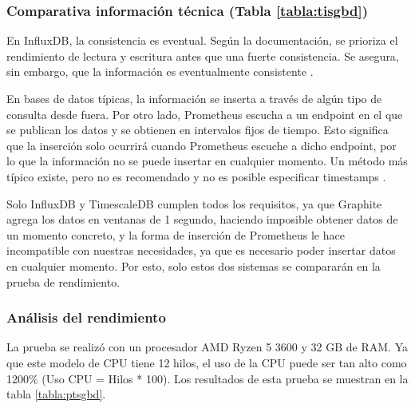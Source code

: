 \subsubsection*{Comparativa información técnica (Tabla \ref*{tabla:tisgbd})} En InfluxDB, la consistencia es eventual. Según
la documentación, se prioriza el rendimiento de lectura y escritura antes que una fuerte consistencia. Se asegura, sin 
embargo, que la información es eventualmente consistente \cite{influx:consistency}.

En bases de datos típicas, la información se inserta a través de algún tipo de consulta desde fuera. Por otro lado, 
Prometheus escucha a un endpoint en el que se publican los datos y se obtienen en intervalos fijos de tiempo. Esto 
significa que la inserción solo ocurrirá cuando Prometheus escuche a dicho endpoint, por lo que la información no se 
puede insertar en cualquier momento. Un método más típico existe, pero no es recomendado y no es posible especificar 
timestamps \cite{prom:pushgateway}.

Solo InfluxDB y TimescaleDB cumplen todos los requisitos, ya que Graphite agrega los datos en ventanas de 1 segundo,
haciendo imposible obtener datos de un momento concreto, y la forma de inserción de Prometheus le hace incompatible 
con nuestras necesidades, ya que es necesario poder insertar datos en cualquier momento. Por esto, solo estos dos
sistemas se compararán en la prueba de rendimiento.

\subsubsection*{Análisis del rendimiento} La prueba se realizó con un procesador AMD Ryzen 5 3600 y 32 GB de RAM. Ya que 
este modelo de CPU tiene 12 hilos, el uso de la CPU puede ser tan alto como 1200\% (Uso CPU = Hilos * 100). Los resultados
de esta prueba se muestran en la tabla \ref*{tabla:ptsgbd}.


